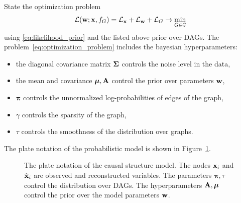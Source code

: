 \documentclass[12pt]{article}
\begin{document}
State the optimization problem
\begin{equation}
    \mathcal{L} (\mathbf{w}; \mathbf{x}, {f_{G}})  = \mathcal{L}_{\mathbf{x}} + \mathcal{L}_{\mathbf{w}} + \mathcal{L}_G \to \min\limits_{G\in\mathcal{G}}
    \label{eq:optimization_problem}
\end{equation}
using \eqref{eq:likelihood_prior} and the listed above prior over DAGs.
The problem~\eqref{eq:optimization_problem} includes the bayesian hyperparameters:
\begin{itemize}
    \item[] the diagonal covariance matrix ${\boldsymbol{\Sigma}}$ controls the noise level in the data,
    \item[] the mean and covariance ${\boldsymbol{\mu}}, \mathbf{A}$ control the prior over parameters $\mathbf{w}$,
    \item[] $\boldsymbol{\pi}$ controls the unnormalized log-probabilities of edges of the graph,
    \item[] $\gamma$ controls the sparsity of the graph,
    \item[] $\tau$ controls the smoothness of the distribution over graphs.
\end{itemize}
The plate notation of the probabilistic model is shown in Figure~\ref{fig:plate}.

\begin{figure}[ht]
    \centering
    \caption{The plate notation of the causal structure model.
    The nodes $\mathbf{x}_i$ and $\hat{\mathbf{x}}_i$ are observed and reconstructed variables.
    The parameters $\boldsymbol{\pi}, \tau$ control the distribution over DAGs.
    The hyperparameters $\mathbf{A}, {\boldsymbol{\mu}}$ control the prior over the model parameters $\mathbf{w}$.}
    \label{fig:plate}
\end{figure}
\end{document}
